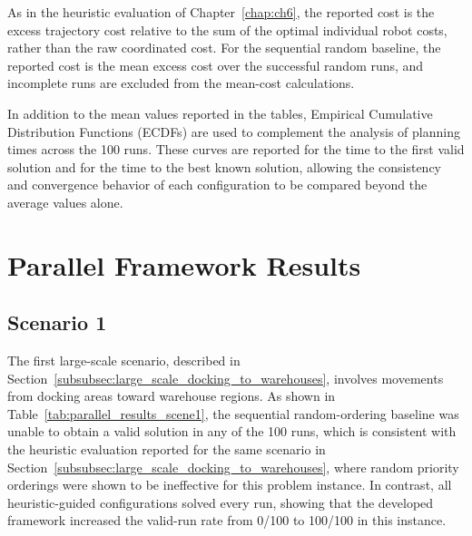 As in the heuristic evaluation of Chapter~\ref{chap:ch6}, the reported cost is the excess trajectory
cost relative to the sum of the optimal individual robot costs, rather than the raw coordinated cost.
For the sequential random baseline, the reported cost is the mean excess cost over the successful
random runs, and incomplete runs are excluded from the mean-cost calculations.

In addition to the mean values reported in the tables, Empirical Cumulative Distribution Functions
(ECDFs) are used to complement the analysis of planning times across the 100 runs. These curves
are reported for the time to the first valid solution and for the time to the best known solution,
allowing the consistency and convergence behavior of each configuration to be compared beyond
the average values alone.





\section{Parallel Framework Results}
\label{sec:parallel_framework_results}

\subsection{Scenario 1}
\label{subsec:parallel_results_scene1}
\hspace{\parindent}
The first large-scale scenario, described in
Section~\ref{subsubsec:large_scale_docking_to_warehouses}, involves movements from docking
areas toward warehouse regions. As shown in Table~\ref{tab:parallel_results_scene1}, the sequential random-ordering baseline was unable to obtain a valid solution in any of the 100 runs, which is consistent with the heuristic evaluation reported for the same scenario in Section~\ref{subsubsec:large_scale_docking_to_warehouses}, where random priority orderings were shown to be ineffective for this problem instance.
 In contrast, all heuristic-guided configurations
solved every run, showing that the developed framework increased the valid-run rate from 0/100 to
100/100 in this instance.


